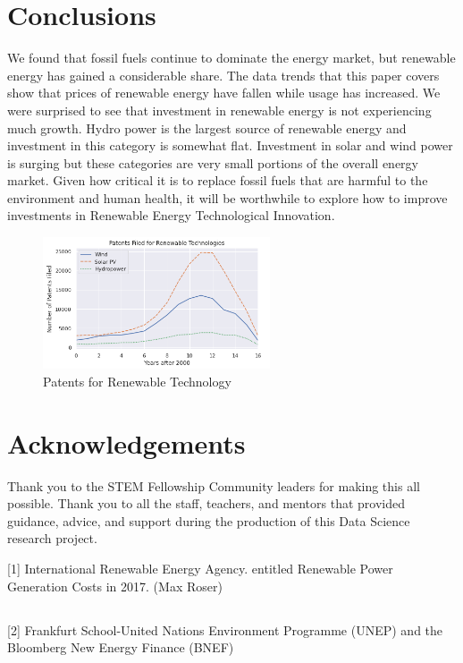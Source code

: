 \documentclass[10pt,twocolumn,letterpaper]{article}
\begin{document}
\section{Conclusions}
We found that fossil fuels continue to dominate the energy market, but renewable energy has gained a considerable share. The data trends that this paper covers show that prices of renewable energy have fallen while usage has increased. We were surprised to see that investment in renewable energy is not experiencing much growth. Hydro power is the largest source of renewable energy and investment in this category is somewhat flat. Investment in solar and wind power is surging but these categories are very small portions of the overall energy market. Given how critical it is to replace fossil fuels that are harmful to the environment and human health, it will be worthwhile to explore how to improve investments in Renewable Energy Technological Innovation.

\begin{figure}
    \centering{}
    \includegraphics[width=0.6\textwidth]{figures/patents_statistics.PNG}
    \caption{Patents for Renewable Technology}

\end{figure}

\section*{Acknowledgements}
Thank you to the STEM Fellowship Community leaders for making this all possible. Thank you to all the staff, teachers, and mentors that provided guidance, advice, and support during the production of this Data Science research project. 


[1] International Renewable Energy Agency. entitled Renewable Power Generation Costs in 2017. (Max Roser)
\subsection*{}
[2] Frankfurt School-United Nations Environment Programme (UNEP) and the Bloomberg New Energy Finance (BNEF)
\end{document}
